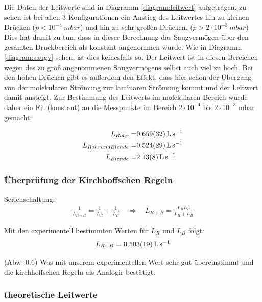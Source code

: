 \documentclass[12pt, a4paper]{scrartcl}
\begin{document}
        Die Daten der Leitwerte sind in Diagramm \ref{diagram:leitwert}
        aufgetragen. zu sehen ist bei allen 3 Konfigurationen ein Anstieg des Leitwertes hin zu kleinen Drücken
        ($p < 10^{-4}\ mbar$)
        und hin zu sehr großen Drücken.
        ($p > 2\cdot 10^{-3}\ mbar$)
        Dies hat damit zu tun, dass in dieser Berechnung das Saugvermögen über den gesamten Druckbereich als konstant angenommen wurde. Wie in Diagramm
        \ref{diagram:saugv} sehen, ist dies keinesfalls so.
        Der Leitwert ist in diesen Bereichen wegen des zu groß angenommenen Saugvermögens selbst auch viel zu hoch. Bei den hohen Drücken gibt es außerdem den Effekt, dass hier schon der Übergang von der molekularen Strömung zur laminaren Strömung kommt und der Leitwert damit ansteigt.
        Zur Bestimmung des Leitwerts im molekularen Bereich wurde daher ein Fit (konstant) an die Messpunkte im Bereich 
        $2\cdot 10^{-4}$ bis $2\cdot 10^{-3}$ mbar
        gemacht:
        
        \begin{align*}
            L_{Rohr}=&\SI{.659+-.032}{\litre\per\second}\\
            L_{Rohr und Blende}=&\SI{.524+-.029}{\litre\per\second}\\
            L_{Blende}=&\SI{2.13+-0.08}{\litre\per\second}
        \end{align*}
        
        \subsubsection*{Überprüfung der Kirchhoffschen Regeln}
        
        Serienschaltung:
        \begin{align}
			\frac 1{L_{R+B}} = \frac 1 {L_R} + \frac 1 {L_B} \quad \Leftrightarrow \quad L_{R+B} = \frac{L_R L_B}{L_R+L_B}
			\label{f:kirch}
        \end{align}
        
        Mit den experimentell bestimmten Werten für $L_R$ und $L_B$ folgt:
        \begin{align}
        	L_{R+B} = \SI{.503+-.019}{\litre\per\second}
        \end{align}
        
        (Abw: \SI{0.6}{\sigma}) Was mit unserem experimentellen Wert sehr gut übereinstimmt und die kirchhoffschen Regeln als Analogir bestätigt.
        
        \subsubsection*{theoretische Leitwerte}
        
\end{document}
